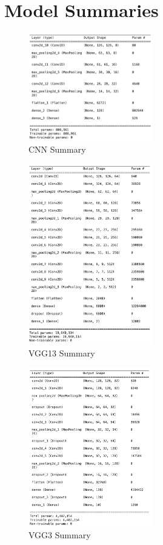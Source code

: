 \section{Model Summaries}
\begin{figure}
    \centering
    \includegraphics[width=0.48\textwidth]{Images/cnn_summary.png}
    \caption{CNN Summary}
    \label{fig:cnn_summary}
\end{figure}
\begin{figure}
    \centering
    \includegraphics[width=0.48\textwidth]{Images/vgg13_summary.png}
    \caption{VGG13 Summary}
    \label{fig:vgg13_summary}
\end{figure}
\begin{figure}
    \centering
    \includegraphics[width=0.48\textwidth]{Images/vgg3_summary.png}
    \caption{VGG3 Summary}
    \label{fig:vgg3_summary}
\end{figure}

